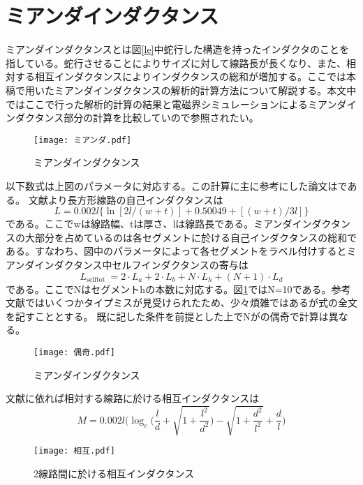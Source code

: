 \section{ミアンダインダクタンス}
ミアンダインダクタンスとは図\ref{le}中蛇行した構造を持ったインダクタのことを指している。蛇行させることによりサイズに対して線路長が長くなり、また、相対する相互インダクタンスによりインダクタンスの総和が増加する。ここでは本稿で用いたミアンダインダクタンスの解析的計算方法について解説する。本文中ではここで行った解析的計算の結果と電磁界シミュレーションによるミアンダインダクタンス部分の計算を比較していので参照されたい。
\begin{figure}[H]
    \label{ミアンダ}
    \centering
    \texttt{[image: ミアンダ.pdf]}
    \caption{ミアンダインダクタンス}
\end{figure}
以下数式は上図のパラメータに対応する。この計算に主に参考にした論文は\cite*{Stojanovic2004}である。
文献\cite*{Grover}より長方形線路の自己インダクタンスは
\begin{equation}
    L=0.002 l\{\ln [2 l /(w+t)]+0.50049+[(w+t) / 3 l]\}
\end{equation}
である。ここでwは線路幅、tは厚さ、lは線路長である。ミアンダインダクタンスの大部分を占めているのは各セグメントに於ける自己インダクタンスの総和である。すなわち、図中のパラメータによって各セグメントをラベル付けするとミアンダインダクタンス中セルフインダクタンスの寄与は
\begin{equation}
    L_{\text {selftot }}=2 \cdot L_{a}+2 \cdot L_{b}+N \cdot L_{h}+(N+1) \cdot L_{d}
\end{equation}
である。ここでNはセグメントhの本数に対応する。図\ref*{ミアンダ}ではN=10である。参考文献ではいくつかタイプミスが見受けられたため、少々煩雑ではあるが式の全文を記すこととする。
既に記した条件を前提とした上でNがの偶奇で計算は異なる。
\begin{figure}[H]
    \label{偶奇}
    \centering
    \texttt{[image: 偶奇.pdf]}
    \caption{ミアンダインダクタンス}
\end{figure}
文献\cite*{Grover}に依れば相対する線路に於ける相互インダクタンスは
\begin{equation}
    M=0.002 l\biggl(\log _{e}\biggl(\frac{l}{d}+\sqrt{1+\frac{l^{2}}{d^{2}}}\biggr)-\sqrt{1+\frac{d^{2}}{l^{2}}}+\frac{d}{l}\biggr)
\end{equation}
\begin{figure}[H]
    \label{相互}
    \centering
    \texttt{[image: 相互.pdf]}
    \caption{2線路間に於ける相互インダクタンス}
\end{figure}
